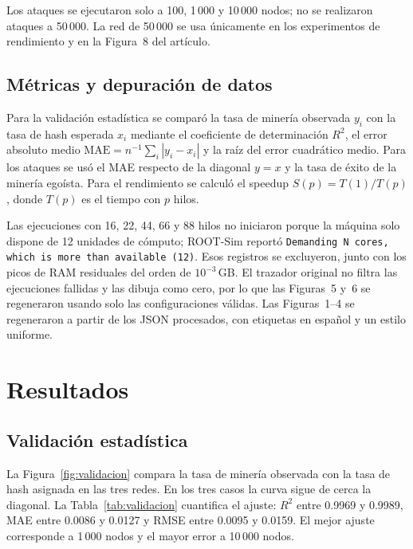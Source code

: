 \documentclass[11pt,a4paper,oneside]{article}
\begin{document}
Los ataques se ejecutaron solo a 100, 1\,000 y 10\,000 nodos; no se realizaron ataques a 50\,000. La red de 50\,000 se usa únicamente en los experimentos de rendimiento y en la Figura~8 del artículo.

\subsection{Métricas y depuración de datos}

Para la validación estadística se comparó la tasa de minería observada $y_i$ con la tasa de hash esperada $x_i$ mediante el coeficiente de determinación $R^2$, el error absoluto medio $\mathrm{MAE}=n^{-1}\sum_i |y_i-x_i|$ y la raíz del error cuadrático medio. Para los ataques se usó el MAE respecto de la diagonal $y=x$ y la tasa de éxito de la minería egoísta. Para el rendimiento se calculó el speedup $S(p)=T(1)/T(p)$, donde $T(p)$ es el tiempo con $p$ hilos.

Las ejecuciones con 16, 22, 44, 66 y 88 hilos no iniciaron porque la máquina solo dispone de 12 unidades de cómputo; ROOT-Sim reportó \texttt{Demanding N cores, which is more than available (12)}. Esos registros se excluyeron, junto con los picos de RAM residuales del orden de $10^{-3}$\,GB. El trazador original no filtra las ejecuciones fallidas y las dibuja como cero, por lo que las Figuras~5 y~6 se regeneraron usando solo las configuraciones válidas. Las Figuras~1--4 se regeneraron a partir de los JSON procesados, con etiquetas en español y un estilo uniforme.

\section{Resultados}
\label{sec:resultados}

\subsection{Validación estadística}

La Figura~\ref{fig:validacion} compara la tasa de minería observada con la tasa de hash asignada en las tres redes. En los tres casos la curva sigue de cerca la diagonal. La Tabla~\ref{tab:validacion} cuantifica el ajuste: $R^2$ entre 0.9969 y 0.9989, MAE entre 0.0086 y 0.0127 y RMSE entre 0.0095 y 0.0159. El mejor ajuste corresponde a 1\,000 nodos y el mayor error a 10\,000 nodos.
\end{document}

